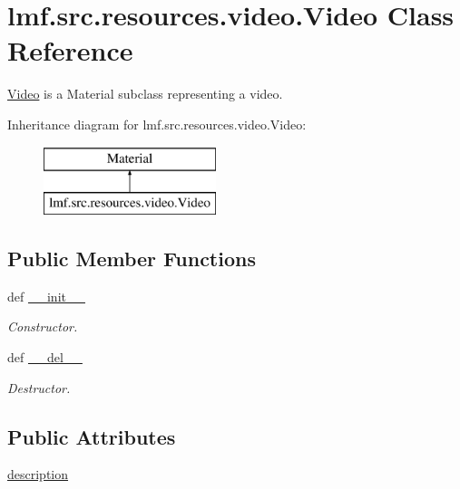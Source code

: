 \hypertarget{classlmf_1_1src_1_1resources_1_1video_1_1_video}{\section{lmf.\+src.\+resources.\+video.\+Video Class Reference}
\label{classlmf_1_1src_1_1resources_1_1video_1_1_video}
}


\hyperlink{classlmf_1_1src_1_1resources_1_1video_1_1_video}{Video} is a Material subclass representing a video.  


Inheritance diagram for lmf.\+src.\+resources.\+video.\+Video\+:\begin{figure}[H]
\begin{center}
\leavevmode
\includegraphics[height=2.000000cm]{classlmf_1_1src_1_1resources_1_1video_1_1_video}
\end{center}
\end{figure}
\subsection*{Public Member Functions}
\begin{DoxyCompactItemize}
\item 
def \hyperlink{classlmf_1_1src_1_1resources_1_1video_1_1_video_a462c094b953b8c030b557184708222cd}{\+\_\+\+\_\+init\+\_\+\+\_\+}
\begin{DoxyCompactList}\small\item\em Constructor. \end{DoxyCompactList}\item 
def \hyperlink{classlmf_1_1src_1_1resources_1_1video_1_1_video_a2926a640d348c5cadf03c67cba87de0a}{\+\_\+\+\_\+del\+\_\+\+\_\+}
\begin{DoxyCompactList}\small\item\em Destructor. \end{DoxyCompactList}\end{DoxyCompactItemize}
\subsection*{Public Attributes}
\begin{DoxyCompactItemize}
\item 
\hyperlink{classlmf_1_1src_1_1resources_1_1video_1_1_video_a21f39ce29f1958b3c82169eabbffc34d}{description}
\end{DoxyCompactItemize}



